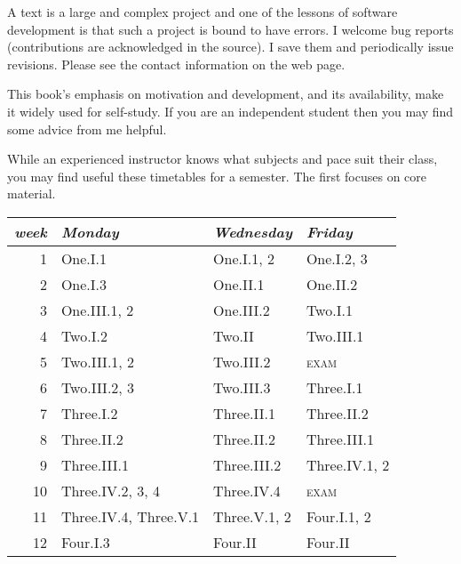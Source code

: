 {A text is a large and complex project and one of the lessons of software
development is that such a project is bound to have errors.
I welcome bug reports
(contributions are acknowledged in the source).
I save them and periodically issue revisions.
Please see the contact information on the web page.


\newcommand{\classday}[1]{\textsc{#1}}
\newcommand{\colwidth}{1.25in}

\medskip
{}
%
This book's emphasis on motivation and development,
and its availability, make it widely used for self-study.
If you are an independent student 
then you may find some advice from me helpful.

While an experienced instructor knows what subjects and
pace suit their class, you may find useful these
timetables for a semester.
The first focuses on core material.
\begin{center} \small
   \begin{tabular}{r|*{2}{p{\colwidth}}l}
      \textit{week}  
       &\textit{Monday}          
       &\textit{Wednesday}            
       &\textit{Friday}        \\ \hline
       1    &One.I.1         &One.I.1, 2        &One.I.2, 3         \\
       2    &One.I.3         &One.II.1          &One.II.2         \\
       3    &One.III.1, 2    &One.III.2         &Two.I.1         \\
       4    &Two.I.2         &Two.II            &Two.III.1         \\
       5    &Two.III.1, 2    &Two.III.2         &\classday{exam}          \\
       6    &Two.III.2, 3    &Two.III.3         &Three.I.1        \\
       7    &Three.I.2         &Three.II.1          &Three.II.2         \\
       8    &Three.II.2        &Three.II.2          &Three.III.1          \\
       9    &Three.III.1       &Three.III.2         &Three.IV.1, 2       \\
      10    &Three.IV.2, 3, 4  &Three.IV.4          &\classday{exam}          \\
      11    &Three.IV.4, Three.V.1 &Three.V.1, 2        &Four.I.1, 2         \\
      12    &Four.I.3         &Four.II            &Four.II       \\

\end{tabular}
\end{center}}
